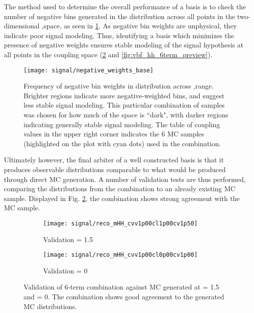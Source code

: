     The method used to determine the overall performance of a basis is to check the number of negative bins generated
        in the \mhh distribution across all points in the two-dimensional \kvv,\kl space, as seen in \ref{fig:vbf_hh_6term_nWeight_grid}.
    As negative bin weights are unphysical, they indicate poor signal modeling.
    Thus, identifying a basis which minimizes the presence of negative weights ensures stable modeling of the signal hypothesis at all points in the coupling space (\ref{fig:vbf_hh_6term_validation} and \ref{fig:vbf_hh_6term_preview}).

    \begin{figure}[tbh]
        \texttt{[image: signal/negative\_weights\_base]}
        \caption{
            Frequency of negative bin weights in \mhh distribution across \kvv,\kl range.
            Brighter regions indicate more negative-weighted bins, and suggest less stable signal modeling.
            This particular combination of samples was chosen for how much of the space is ``dark",
                with darker regions indicating generally stable signal modeling.
            The table of coupling values in the upper right corner indicates the 6 MC samples
                (highlighted on the plot with cyan dots) used in the combination.
        }
        \label{fig:vbf_hh_6term_nWeight_grid}
    \end{figure}

    Ultimately however, the final arbiter of a well constructed basis is that it produces observable distributions comparable to what would be produced through direct MC generation.
    A number of validation tests are thus performed, comparing the distributions from the combination to an already existing MC sample.
    Displayed in Fig. \ref{fig:vbf_hh_6term_validation}, the combination shows strong agreement with the MC sample.

    \begin{figure}[tbh]
        \begin{subfigure}{0.48\textwidth}
            \texttt{[image: signal/reco\_mHH\_cvv1p00cl1p00cv1p50]}
            \captionsetup{justification=centering} \caption{Validation \kv = 1.5}
        \end{subfigure}
        \begin{subfigure}{0.48\textwidth}
            \texttt{[image: signal/reco\_mHH\_cvv1p00cl0p00cv1p00]}
            \captionsetup{justification=centering} \caption{Validation \kl = 0}
        \end{subfigure}
        \caption{
            Validation of 6-term combination against MC generated at \kv = 1.5 and \kl = 0.
            The combination shows good agreement to the generated MC distributions.
        }
        \label{fig:vbf_hh_6term_validation}
    \end{figure}

